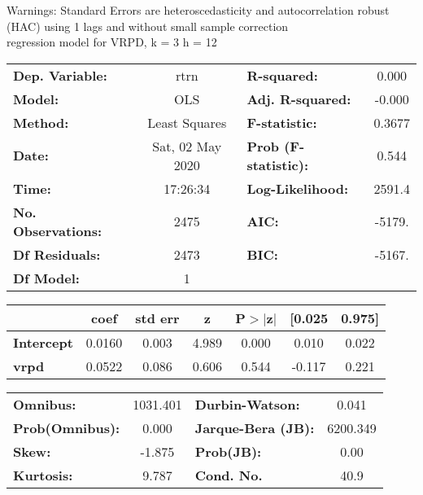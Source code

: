 Warnings: \newline
 [1] Standard Errors are heteroscedasticity and autocorrelation robust (HAC) using 1 lags and without small sample correction\\ 

regression model for VRPD, k = 3 h = 12\begin{center}
\begin{tabular}{lclc}
\toprule
\textbf{Dep. Variable:}    &       rtrn       & \textbf{  R-squared:         } &     0.000   \\
\textbf{Model:}            &       OLS        & \textbf{  Adj. R-squared:    } &    -0.000   \\
\textbf{Method:}           &  Least Squares   & \textbf{  F-statistic:       } &    0.3677   \\
\textbf{Date:}             & Sat, 02 May 2020 & \textbf{  Prob (F-statistic):} &    0.544    \\
\textbf{Time:}             &     17:26:34     & \textbf{  Log-Likelihood:    } &    2591.4   \\
\textbf{No. Observations:} &        2475      & \textbf{  AIC:               } &    -5179.   \\
\textbf{Df Residuals:}     &        2473      & \textbf{  BIC:               } &    -5167.   \\
\textbf{Df Model:}         &           1      & \textbf{                     } &             \\
\bottomrule
\end{tabular}
\begin{tabular}{lcccccc}
                   & \textbf{coef} & \textbf{std err} & \textbf{z} & \textbf{P$> |$z$|$} & \textbf{[0.025} & \textbf{0.975]}  \\
\midrule
\textbf{Intercept} &       0.0160  &        0.003     &     4.989  &         0.000        &        0.010    &        0.022     \\
\textbf{vrpd}      &       0.0522  &        0.086     &     0.606  &         0.544        &       -0.117    &        0.221     \\
\bottomrule
\end{tabular}
\begin{tabular}{lclc}
\textbf{Omnibus:}       & 1031.401 & \textbf{  Durbin-Watson:     } &    0.041  \\
\textbf{Prob(Omnibus):} &   0.000  & \textbf{  Jarque-Bera (JB):  } & 6200.349  \\
\textbf{Skew:}          &  -1.875  & \textbf{  Prob(JB):          } &     0.00  \\
\textbf{Kurtosis:}      &   9.787  & \textbf{  Cond. No.          } &     40.9  \\
\bottomrule
\end{tabular}
\end{center}

